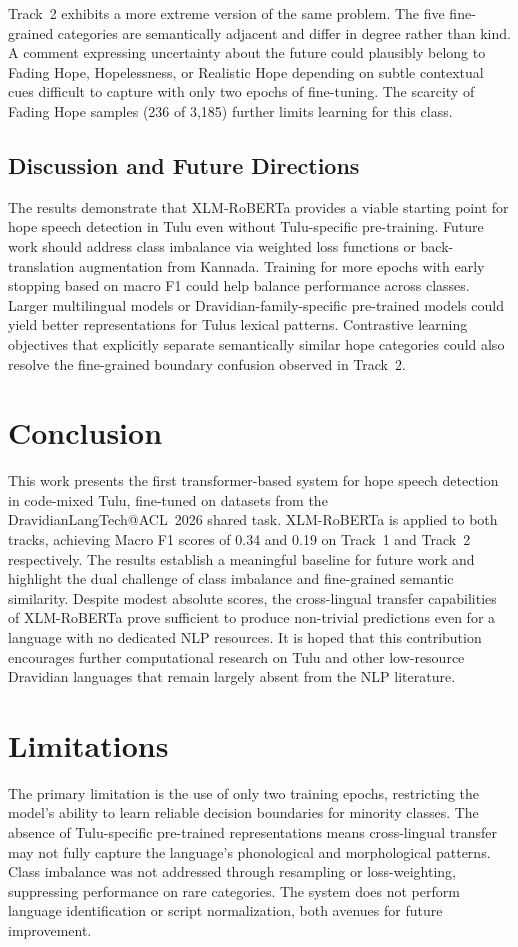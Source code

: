 \documentclass[11pt]{article}
\begin{document}
Track~2 exhibits a more extreme version of the same problem. The five fine-grained
categories are semantically adjacent and differ in degree rather than kind. A comment
expressing uncertainty about the future could plausibly belong to Fading Hope,
Hopelessness, or Realistic Hope depending on subtle contextual cues difficult to
capture with only two epochs of fine-tuning. The scarcity of Fading Hope samples
(236 of 3,185) further limits learning for this class.

\subsection{Discussion and Future Directions}
The results demonstrate that XLM-RoBERTa provides a viable starting point for
hope speech detection in Tulu even without Tulu-specific pre-training. Future work
should address class imbalance via weighted loss functions or back-translation
augmentation from Kannada. Training for more epochs with early stopping based on
macro F1 could help balance performance across classes. Larger multilingual models
or Dravidian-family-specific pre-trained models could yield better representations
for Tulu\textquotesingle{}s lexical patterns. Contrastive learning objectives that
explicitly separate semantically similar hope categories could also resolve the
fine-grained boundary confusion observed in Track~2.

\section{Conclusion}
This work presents the first transformer-based system for hope speech detection in
code-mixed Tulu, fine-tuned on datasets from the DravidianLangTech@ACL~2026 shared
task. XLM-RoBERTa is applied to both tracks, achieving Macro F1 scores of 0.34 and
0.19 on Track~1 and Track~2 respectively. The results establish a meaningful baseline
for future work and highlight the dual challenge of class imbalance and fine-grained
semantic similarity. Despite modest absolute scores, the cross-lingual transfer
capabilities of XLM-RoBERTa prove sufficient to produce non-trivial predictions
even for a language with no dedicated NLP resources. It is hoped that this
contribution encourages further computational research on Tulu and other low-resource
Dravidian languages that remain largely absent from the NLP literature.

\section*{Limitations}
The primary limitation is the use of only two training epochs, restricting the
model's ability to learn reliable decision boundaries for minority classes. The
absence of Tulu-specific pre-trained representations means cross-lingual transfer
may not fully capture the language's phonological and morphological patterns. Class
imbalance was not addressed through resampling or loss-weighting, suppressing
performance on rare categories. The system does not perform language identification
or script normalization, both avenues for future improvement.
\end{document}

